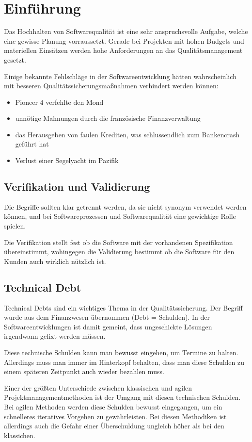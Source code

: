 \chapter{Einführung}
Das Hochhalten von Softwarequalität ist eine sehr anspruchsvolle Aufgabe, welche eine gewisse Planung vorraussetzt. Gerade bei Projekten mit hohen Budgets und materiellen Einsätzen werden hohe Anforderungen an das Qualitätsmanagement gesetzt.

Einige bekannte Fehlschläge in der Softwareentwicklung hätten wahrscheinlich mit besseren Qualitätssicherungsmaßnahmen verhindert werden können:

\begin{itemize}
    \item Pioneer 4 verfehlte den Mond
    \item unnötige Mahnungen durch die französische Finanzverwaltung
    \item das Herausgeben von faulen Krediten, was schlussendlich zum Bankencrash geführt hat
    \item Verlust einer Segelyacht im Pazifik
\end{itemize}

\section{Verifikation und Validierung}
Die Begriffe sollten klar getrennt werden, da sie nicht synonym verwendet werden können, und bei Softwareprozessen und Softwarequalität eine gewichtige Rolle spielen.

Die Verifikation stellt fest ob die Software mit der vorhandenen Spezifikation übereinstimmt, wohingegen die Validierung bestimmt ob die Software für den Kunden auch wirklich nützlich ist.

\section{Technical Debt}
Technical Debts sind ein wichtiges Thema in der Qualitätssicherung. Der Begriff wurde aus dem Finanzwesen übernommen (Debt = Schulden). In der Softwareentwicklungen ist damit gemeint, dass ungeschickte Lösungen irgendwann gefixt werden müssen.

Diese technische Schulden kann man bewusst eingehen, um Termine zu halten. Allerdings muss man immer im Hinterkopf behalten, dass man diese Schulden zu einem späteren Zeitpunkt auch wieder bezahlen muss.

Einer der größten Unterschiede zwischen klassischen und agilen Projektmanagementmethoden ist der Umgang mit diesen technischen Schulden. Bei agilen Methoden werden diese Schulden bewusst eingegangen, um ein schnelleres iteratives Vorgehen zu gewährleisten. Bei diesen Methodiken ist allerdings auch die Gefahr einer Überschuldung ungleich höher als bei den klassichen.

